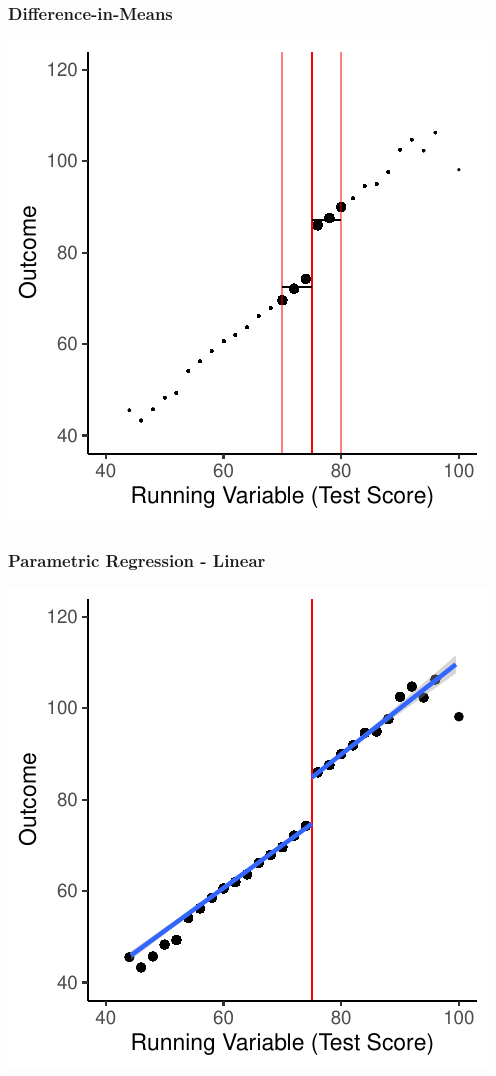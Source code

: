 \documentclass[xcolor=x11names,compress]{beamer}\usepackage[]{graphicx}\usepackage[]{xcolor}
\makeatletter
\def\maxwidth{ %
  \ifdim\Gin@nat@width>\linewidth
    \linewidth
  \else
    \Gin@nat@width
  \fi
}
\newenvironment{knitrout}{}{} %
\renewcommand{\(}{\begin{columns}}
\renewcommand{\)}{\end{columns}}
\newcommand{\<}[1]{\begin{column}{#1}}
\renewcommand{\>}{\end{column}}
\makeatother
\begin{document}
\begin{frame}
\frametitle{Difference-in-Means}
\begin{center}
\begin{knitrout}
\color{fgcolor}
\includegraphics[width=\maxwidth]{figure/chart3-1} 
\end{knitrout}
\end{center}
\end{frame}

\begin{frame}
\frametitle{Parametric Regression - Linear}
\begin{center}
\begin{knitrout}
\color{fgcolor}
\includegraphics[width=\maxwidth]{figure/chart4-1} 
\end{knitrout}
\end{center}
\end{frame}
\end{document}
